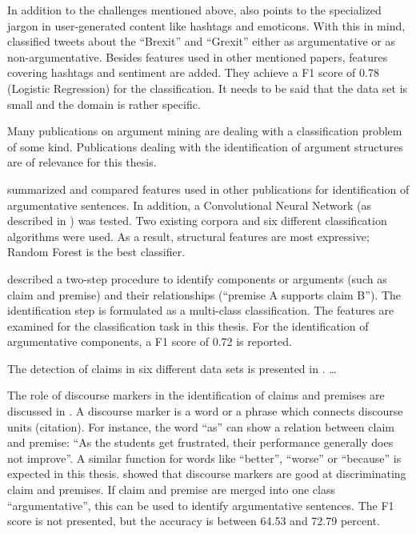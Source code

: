 In addition to the challenges mentioned above, \cite{Dusmanu2017Argument-Mining} also points to the specialized jargon in user-generated content like hashtags and emoticons. With this in mind, \cite{Dusmanu2017Argument-Mining} classified tweets about the \enquote{Brexit} and \enquote{Grexit} either as argumentative or as non-argumentative. Besides features used in other mentioned papers, features covering hashtags and sentiment are added. They achieve a F1 score of 0.78 (Logistic Regression) for the classification. It needs to be said that the data set is small and the domain is rather specific.\newline

Many publications on argument mining are dealing with a classification problem of some kind. Publications dealing with the identification of argument structures are of relevance for this thesis.

\cite{Aker2017What-works-and-} summarized and compared features used in other publications for identification of argumentative sentences. In addition, a Convolutional Neural Network (as described in \cite{Kim2014Convolutional-N}) was tested. Two existing corpora and six different classification algorithms were used. As a result, structural features are most expressive; Random Forest is the best classifier.

\cite{Stab2014Identifying-Arg} described a two-step procedure to identify components or arguments (such as claim and premise) and their relationships (\enquote{premise A supports claim B}). The identification step is formulated as a multi-class classification. The features are examined for the classification task in this thesis. For the identification of argumentative components, a F1 score of 0.72 is reported.

The detection of claims in six different data sets is presented in \cite{Daxenberger2017What-is-the-Ess}. \dots

The role of discourse markers in the identification of claims and premises are discussed in \cite{Eckle-Kohler2015On-the-Role-of-}. A discourse marker is a word or a phrase which connects discourse units (citation). For instance, the word \enquote{as} can show a relation between claim and premise: \enquote{As the students get frustrated, their performance generally does not improve}.  A similar function for words like \enquote{better}, \enquote{worse} or \enquote{because} is expected in this thesis. \cite{Eckle-Kohler2015On-the-Role-of-} showed that discourse markers are good at discriminating claim and premises. If claim and premise are merged into one class \enquote{argumentative}, this can be used to identify argumentative sentences. The F1 score is not presented, but the accuracy is between 64.53 and 72.79 percent.

